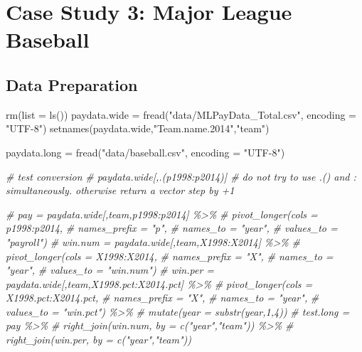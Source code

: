 \documentclass[
  12pt,
]{article}
\newenvironment{Shaded}{\begin{snugshade}}{\end{snugshade}}
\newcommand{\AttributeTok}[1]{\textcolor[rgb]{0.77,0.63,0.00}{#1}}
\newcommand{\CommentTok}[1]{\textcolor[rgb]{0.56,0.35,0.01}{\textit{#1}}}
\newcommand{\FunctionTok}[1]{\textcolor[rgb]{0.00,0.00,0.00}{#1}}
\newcommand{\NormalTok}[1]{#1}
\newcommand{\OtherTok}[1]{\textcolor[rgb]{0.56,0.35,0.01}{#1}}
\newcommand{\StringTok}[1]{\textcolor[rgb]{0.31,0.60,0.02}{#1}}
\begin{document}
\hypertarget{case-study-3-major-league-baseball}{%
\section{Case Study 3: Major League
Baseball}\label{case-study-3-major-league-baseball}}

\hypertarget{data-preparation-2}{%
\subsection{Data Preparation}\label{data-preparation-2}}

\begin{Shaded}
\begin{Highlighting}[]
\FunctionTok{rm}\NormalTok{(}\AttributeTok{list =} \FunctionTok{ls}\NormalTok{())}
\NormalTok{paydata.wide }\OtherTok{=} \FunctionTok{fread}\NormalTok{(}\StringTok{"data/MLPayData\_Total.csv"}\NormalTok{, }\AttributeTok{encoding =} \StringTok{"UTF{-}8"}\NormalTok{)}
\FunctionTok{setnames}\NormalTok{(paydata.wide,}\StringTok{"Team.name.2014"}\NormalTok{,}\StringTok{"team"}\NormalTok{)}

\NormalTok{paydata.long }\OtherTok{=} \FunctionTok{fread}\NormalTok{(}\StringTok{"data/baseball.csv"}\NormalTok{, }\AttributeTok{encoding =} \StringTok{"UTF{-}8"}\NormalTok{)}

\CommentTok{\# test conversion}
\CommentTok{\# paydata.wide[,.(p1998:p2014)] \# do not try to use .() and : simultaneously. otherwise return a vector step by +1}

\CommentTok{\# pay = paydata.wide[,team,p1998:p2014] \%\textgreater{}\%}
\CommentTok{\#   pivot\_longer(cols = p1998:p2014,}
\CommentTok{\#                names\_prefix = "p",}
\CommentTok{\#                names\_to = "year",}
\CommentTok{\#                values\_to = "payroll")}
\CommentTok{\# win.num = paydata.wide[,team,X1998:X2014] \%\textgreater{}\%}
\CommentTok{\#   pivot\_longer(cols = X1998:X2014,}
\CommentTok{\#                names\_prefix = "X",}
\CommentTok{\#                names\_to = "year",}
\CommentTok{\#                values\_to = "win.num")}
\CommentTok{\# win.per = paydata.wide[,team,X1998.pct:X2014.pct] \%\textgreater{}\%}
\CommentTok{\#   pivot\_longer(cols = X1998.pct:X2014.pct,}
\CommentTok{\#                names\_prefix = "X",}
\CommentTok{\#                names\_to = "year",}
\CommentTok{\#                values\_to = "win.pct") \%\textgreater{}\%}
\CommentTok{\#   mutate(year = substr(year,1,4))}
\CommentTok{\# test.long = pay \%\textgreater{}\%}
\CommentTok{\#   right\_join(win.num, by = c("year","team")) \%\textgreater{}\%}
\CommentTok{\#   right\_join(win.per, by = c("year","team"))}


\end{Highlighting}
\end{Shaded}
\end{document}
